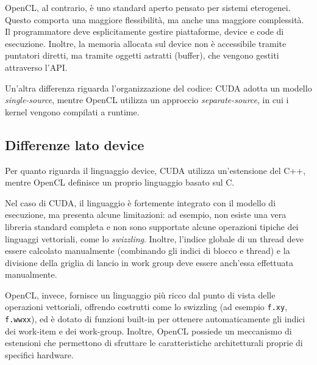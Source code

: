 OpenCL, al contrario, è uno standard aperto pensato per sistemi eterogenei. Questo comporta una maggiore flessibilità, ma anche una maggiore complessità. Il programmatore deve esplicitamente gestire piattaforme, device e code di esecuzione. Inoltre, la memoria allocata sul device non è accessibile tramite puntatori diretti, ma tramite oggetti astratti (buffer), che vengono gestiti attraverso l’API.

Un’altra differenza riguarda l’organizzazione del codice: CUDA adotta un modello \emph{single-source}, mentre OpenCL utilizza un approccio \emph{separate-source}, in cui i kernel vengono compilati a runtime.

\subsection{Differenze lato device}

Per quanto riguarda il linguaggio device, CUDA utilizza un’estensione del C++, mentre OpenCL definisce un proprio linguaggio basato sul C.

Nel caso di CUDA, il linguaggio è fortemente integrato con il modello di esecuzione, ma presenta alcune limitazioni: ad esempio, non esiste una vera libreria standard completa e non sono supportate alcune operazioni tipiche dei linguaggi vettoriali, come lo \emph{swizzling}. Inoltre, l’indice globale di un thread deve essere calcolato manualmente (combinando gli indici di blocco e thread) e la divisione della griglia di lancio in work group deve essere anch'essa effettuata manualmente.

OpenCL, invece, fornisce un linguaggio più ricco dal punto di vista delle operazioni vettoriali, offrendo costrutti come lo swizzling (ad esempio \texttt{f.xy}, \texttt{f.wwxx}), ed è dotato di funzioni built-in per ottenere automaticamente gli indici dei work-item e dei work-group. Inoltre, OpenCL possiede un meccanismo di estensioni che permettono di sfruttare le caratteristiche architetturali proprie di specifici hardware.